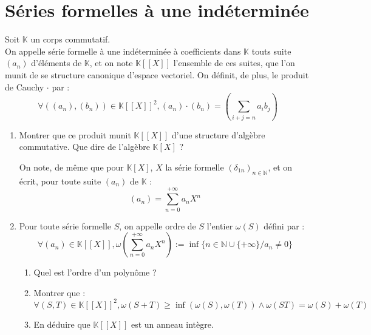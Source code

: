 \section{Séries formelles à une indéterminée}

\begin{exer}
Soit $\mathbb{K}$ un corps commutatif.\\
On appelle série formelle à une indéterminée à coefficients dans $\mathbb{K}$ touts suite $(a_n)$ d'éléments de $\mathbb{K}$, %
et on note $\mathbb{K}[[X]]$ l'ensemble de ces suites, que l'on munit de se structure canonique d'espace vectoriel. %
On définit, de plus, le produit de Cauchy $\cdot$ par :
\[\forall ((a_n),(b_n)) \in \mathbb{K}[[X]]^2 , (a_n)\cdot(b_n) = \left(\sum\limits_{i+j=n} a_i b_j\right)\]
\begin{enumerate}
\item Montrer que ce produit munit $\mathbb{K}[[X]]$ d'une structure d'algèbre commutative. Que dire de l'algèbre $\mathbb{K}[X]$ ?

On note, de même que pour $\mathbb{K}[X]$, $X$ la série formelle $(\delta_{1n})_{n \in \mathbb{N}}$, et on écrit, %
pour toute suite $(a_n)$ de $\mathbb{K}$ :
\[(a_n) = \sum\limits_{n=0}^{+ \infty} a_n X^n\]
\item Pour toute série formelle $S$, on appelle ordre de $S$ l'entier $\omega (S)$ défini par :
\[\forall (a_n) \in \mathbb{K}[[X]] , \omega \left(\sum\limits_{n=0}^{+ \infty}a_nX^n\right) := \inf \{ n \in \mathbb{N}\cup\{+ \infty\} / a_n \neq 0 \}\]
\begin{enumerate}
\item Quel est l'ordre d'un polynôme ?
\item Montrer que :\[\forall (S,T) \in \mathbb{K}[[X]]^2 , \omega(S+T) \geq \inf(\omega(S),\omega(T)) \wedge \omega(ST) = \omega(S) + \omega(T)\]
\item En déduire que $\mathbb{K}[[X]]$ est un anneau intègre.
\end{enumerate}
\end{enumerate}
\end{exer}


